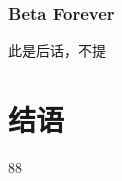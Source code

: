 \documentclass[dvipdfm,serif,mathserif]{beamer}
\begin{document}
\begin{frame}
  \frametitle{Beta Forever}
\begin{center}
 \begin{Large}  此是后话，不提
\end{Large} 

\end{center}

\end{frame}

\section{结语}

\begin{frame}
\begin{center}
 \begin{LARGE}88 \end{LARGE} 
\end{center}
\end{frame}
\end{document}

